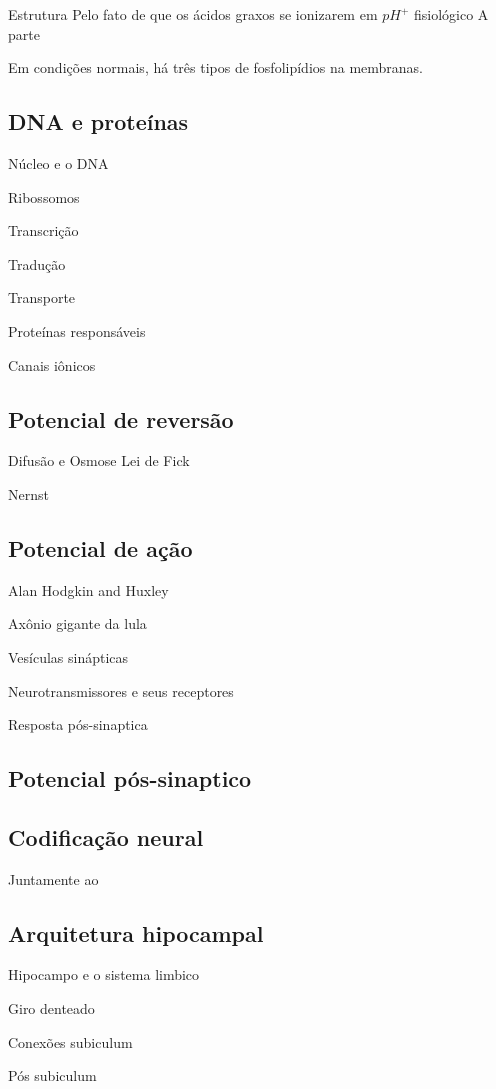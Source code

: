 Estrutura Pelo fato de que os ácidos graxos se ionizarem em $pH^{+}$ fisiológico A parte 

Em condições normais, há três tipos de fosfolipídios na membranas.

\subsection{DNA e proteínas}
Núcleo e o DNA

Ribossomos

Transcrição

Tradução

Transporte

Proteínas responsáveis

Canais iônicos

\subsection{Potencial de reversão}
Difusão e Osmose Lei de Fick

Nernst

\subsection{Potencial de ação}
Alan Hodgkin and Huxley

Axônio gigante da lula

Vesículas sinápticas

Neurotransmissores e seus receptores

Resposta pós-sinaptica

\subsection{Potencial pós-sinaptico}



\subsection{Codificação neural}
Juntamente ao 

\subsection{Arquitetura hipocampal}
Hipocampo e o sistema limbico

Giro denteado

Conexões subiculum

Pós subiculum

